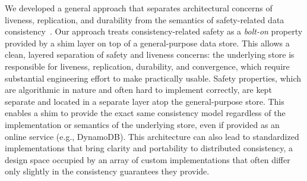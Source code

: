 


We developed a general approach that separates architectural concerns
of liveness, replication, and durability from the semantics of
safety-related data consistency~\cite{bolton}. Our approach treats
consistency-related safety as a \textit{bolt-on} property provided by
a shim layer on top of a general-purpose data store. This allows a
clean, layered separation of safety and liveness concerns: the
underlying store is responsible for liveness, replication, durability,
and convergence, which require substantial engineering effort to make
practically usable. Safety properties, which are algorithmic in nature
and often hard to implement correctly, are kept separate and located
in a separate layer atop the general-purpose store. This enables a
shim to provide the exact same consistency model regardless of the
implementation or semantics of the underlying store, even if provided
as an online service (e.g., DynamoDB). This architecture can also lead
to standardized implementations that bring clarity and portability to
distributed consistency, a design space occupied by an array of custom
implementations that often differ only slightly in the consistency
guarantees they provide.


